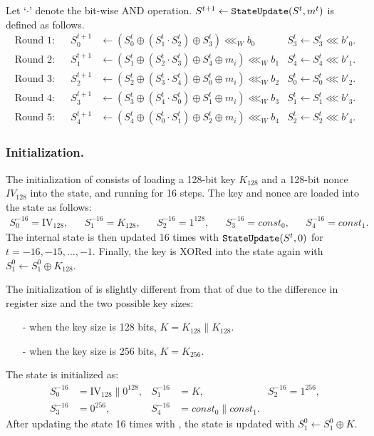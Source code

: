 Let `$\cdot$' denote the bit-wise AND operation. $S^{t+1} \leftarrow \texttt{StateUpdate}{}(S^t,m^t)$ is defined as follows.
\begin{align*}
\textrm{Round 1:} &&
S^{t+1}_0 &\leftarrow ( S^t_0 \oplus (S^t_1 \cdot S^t_2) \oplus S^t_3 ) \lll_W b_0 &
S^t_3 \leftarrow S^t_3 \lll b'_0.\\
\textrm{Round 2:} &&
S^{t+1}_1 &\leftarrow ( S^t_1 \oplus (S^t_2 \cdot S^t_3) \oplus S^t_4 \oplus m_i ) \lll_W b_1 &
S^t_4 \leftarrow S^t_4 \lll b'_1.\\
\textrm{Round 3:} &&
S^{t+1}_2 &\leftarrow ( S^t_2 \oplus (S^t_3 \cdot S^t_4) \oplus S^t_0 \oplus m_i ) \lll_W b_2 &
S^t_0 \leftarrow S^t_0 \lll b'_2.\\
\textrm{Round 4:} &&
S^{t+1}_3 &\leftarrow ( S^t_3 \oplus (S^t_4 \cdot S^t_0) \oplus S^t_1 \oplus m_i ) \lll_W b_3 &
S^t_1 \leftarrow S^t_1 \lll b'_3.\\
\textrm{Round 5:} &&
S^{t+1}_4 &\leftarrow ( S^t_4 \oplus (S^t_0 \cdot S^t_1) \oplus S^t_2 \oplus m_i ) \lll_W b_4 &
S^t_2 \leftarrow S^t_2 \lll b'_4.
\end{align*}

\subsubsection{Initialization.}
The initialization of \MORUS[640] consists of loading a 128-bit key $K_{128}$ and a 128-bit nonce $IV_{128}$ into the state, and running \StateUpdate{} for 16 steps. The key and nonce are loaded into the state as follows:
\begin{align*}
S^{-16}_0 = \textrm{IV}_{128}, &&
S^{-16}_1 = K_{128}, &&
S^{-16}_2 = 1^{128}, &&
S^{-16}_3 = const_0, &&
S^{-16}_4 = const_1.
\end{align*}
The internal state is then updated 16 times with  $\texttt{StateUpdate}{}(S^t,0)$ for $t=-16,-15,\ldots,-1$. Finally, the key is XORed into the state again with $S^0_1 \leftarrow S^0_1 \oplus K_{128}$.

The initialization of \MORUS[1280] is slightly different from that of \MORUS[640] due to the difference in register size and the two possible key sizes:
\begin{itemize}
  \item[-] when the key size is 128 bits, $K = K_{128} \|K_{128}$.
  \item[-] when the key size is 256 bits, $K = K_{256}$.
\end{itemize}
The state is initialized as:
\begin{align*}
S^{-16}_0 &= \textrm{IV}_{128} \| 0^{128}, &
S^{-16}_1 &= K, &
S^{-16}_2 = 1^{256}, \\
S^{-16}_3 &= 0^{256}, &
S^{-16}_4 &= const_0\|const_1.
\end{align*}
After updating the state 16 times with \StateUpdate{}, the state is updated with $S^0_1 \leftarrow S^0_1 \oplus K$.



